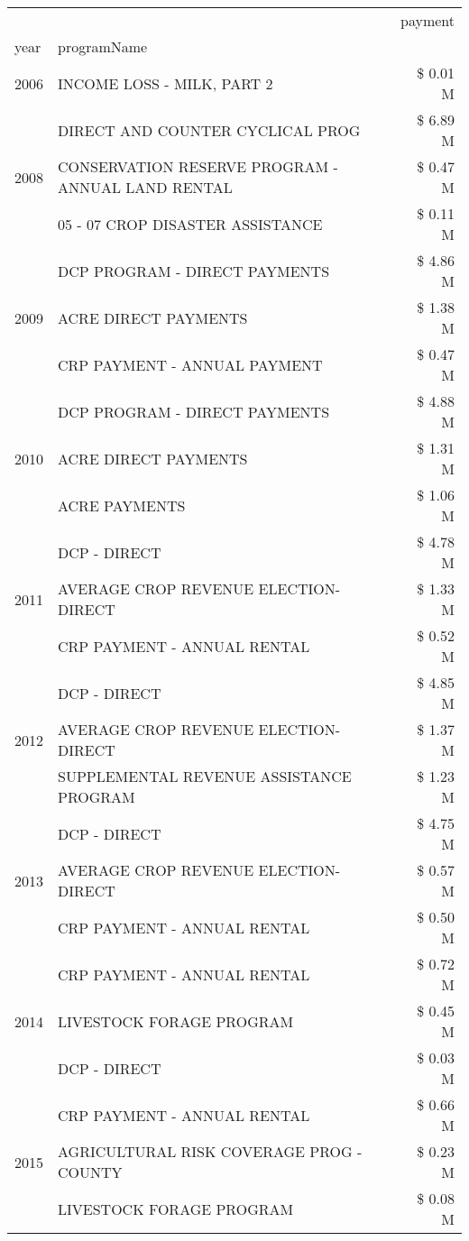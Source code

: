 \begin{tabular}{llr}
\toprule
 &  & payment \\
year & programName &  \\
\midrule
2006 & INCOME LOSS - MILK, PART 2 & \$ 0.01 M \\
\cline{1-3}
\multirow[t]{3}{*}{2008} & DIRECT AND COUNTER CYCLICAL PROG & \$ 6.89 M \\
 & CONSERVATION RESERVE PROGRAM - ANNUAL LAND RENTAL & \$ 0.47 M \\
 & 05 - 07 CROP DISASTER ASSISTANCE & \$ 0.11 M \\
\cline{1-3}
\multirow[t]{3}{*}{2009} & DCP PROGRAM - DIRECT PAYMENTS & \$ 4.86 M \\
 & ACRE DIRECT PAYMENTS & \$ 1.38 M \\
 & CRP PAYMENT - ANNUAL PAYMENT & \$ 0.47 M \\
\cline{1-3}
\multirow[t]{3}{*}{2010} & DCP PROGRAM - DIRECT PAYMENTS & \$ 4.88 M \\
 & ACRE DIRECT PAYMENTS & \$ 1.31 M \\
 & ACRE PAYMENTS & \$ 1.06 M \\
\cline{1-3}
\multirow[t]{3}{*}{2011} & DCP - DIRECT & \$ 4.78 M \\
 & AVERAGE CROP REVENUE ELECTION-DIRECT & \$ 1.33 M \\
 & CRP PAYMENT - ANNUAL RENTAL & \$ 0.52 M \\
\cline{1-3}
\multirow[t]{3}{*}{2012} & DCP - DIRECT & \$ 4.85 M \\
 & AVERAGE CROP REVENUE ELECTION-DIRECT & \$ 1.37 M \\
 & SUPPLEMENTAL REVENUE ASSISTANCE PROGRAM & \$ 1.23 M \\
\cline{1-3}
\multirow[t]{3}{*}{2013} & DCP - DIRECT & \$ 4.75 M \\
 & AVERAGE CROP REVENUE ELECTION-DIRECT & \$ 0.57 M \\
 & CRP PAYMENT - ANNUAL RENTAL & \$ 0.50 M \\
\cline{1-3}
\multirow[t]{3}{*}{2014} & CRP PAYMENT - ANNUAL RENTAL & \$ 0.72 M \\
 & LIVESTOCK FORAGE PROGRAM & \$ 0.45 M \\
 & DCP - DIRECT & \$ 0.03 M \\
\cline{1-3}
\multirow[t]{3}{*}{2015} & CRP PAYMENT - ANNUAL RENTAL & \$ 0.66 M \\
 & AGRICULTURAL RISK COVERAGE PROG - COUNTY & \$ 0.23 M \\
 & LIVESTOCK FORAGE PROGRAM & \$ 0.08 M \\

\end{tabular}
